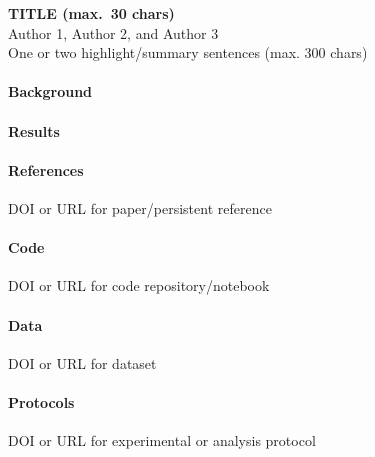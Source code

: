 \documentclass[10pt,a4paper]{article} %
\begin{document}
\begin{center}
    {\large\bfseries TITLE (max.\ 30 chars)}\\[0.5em]
    {\small Author 1, Author 2, and Author 3}\\[1em]
    {\small One or two highlight/summary sentences (max. 300 chars)}
\end{center}

\paragraph{Background}

\paragraph{Results}

\paragraph{References}
\begin{enumerate}[label={[\arabic*]}]
    \item DOI or URL for paper/persistent reference
\end{enumerate}

\paragraph{Code}
\begin{enumerate}[label={[\arabic*]}]
    \item DOI or URL for code repository/notebook
\end{enumerate}

\paragraph{Data}
\begin{enumerate}[label={[\arabic*]}]
    \item DOI or URL for dataset
\end{enumerate}

\paragraph{Protocols}
\begin{enumerate}[label={[\arabic*]}]
    \item DOI or URL for experimental or analysis protocol
\end{enumerate}
\end{document}
